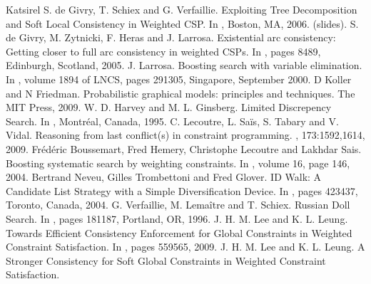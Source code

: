 \documentclass[letterpaper,10pt,openany,oneside,english]{sphinxmanual}
\begin{document}
\begin{sphinxthebibliography}{Katsirel}
S. de Givry, T. Schiex and G. Verfaillie.
Exploiting Tree Decomposition and Soft Local Consistency in Weighted CSP.
In , Boston, MA, 2006.
 (slides).
\sphinxAtStartPar
S. de Givry, M. Zytnicki, F. Heras and J. Larrosa.
Existential arc consistency: Getting closer to full arc consistency in weighted CSPs.
In , pages 84\sphinxhyphen{}89, Edinburgh, Scotland, 2005.
\sphinxAtStartPar
J. Larrosa.
Boosting search with variable elimination.
In ,
volume 1894 of LNCS, pages 291\sphinxhyphen{}305, Singapore, September 2000.
\sphinxAtStartPar
D Koller and N Friedman.
Probabilistic graphical models: principles and techniques.
The MIT Press, 2009.
\sphinxAtStartPar
W. D. Harvey and M. L. Ginsberg.
Limited Discrepency Search.
In , Montréal, Canada, 1995.
\sphinxAtStartPar
C. Lecoutre, L. Saïs, S. Tabary and V. Vidal.
Reasoning from last conflict(s) in constraint programming.
, 173:1592,1614, 2009.
\sphinxAtStartPar
Frédéric Boussemart, Fred Hemery, Christophe Lecoutre and Lakhdar Sais.
Boosting systematic search by weighting constraints.
In , volume 16, page 146, 2004.
\sphinxAtStartPar
Bertrand Neveu, Gilles Trombettoni and Fred Glover.
ID Walk: A Candidate List Strategy with a Simple Diversification Device.
In , pages 423\sphinxhyphen{}437, Toronto, Canada, 2004.
\sphinxAtStartPar
G. Verfaillie, M. Lemaître and T. Schiex.
Russian Doll Search.
In , pages 181\sphinxhyphen{}187, Portland, OR, 1996.
\sphinxAtStartPar
J. H. M. Lee and K. L. Leung.
Towards Efficient Consistency Enforcement for Global Constraints in Weighted Constraint Satisfaction.
In , pages 559\sphinxhyphen{}565, 2009.
\sphinxAtStartPar
J. H. M. Lee and K. L. Leung.
A Stronger Consistency for Soft Global Constraints in Weighted Constraint Satisfaction.

\end{sphinxthebibliography}
\end{document}
